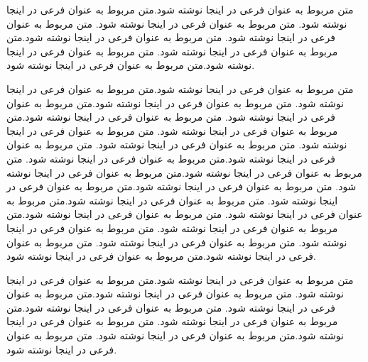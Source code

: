     متن مربوط به عنوان فرعی در اینجا نوشته شود.متن مربوط به عنوان فرعی در اینجا نوشته شود. متن مربوط به عنوان فرعی در اینجا نوشته شود. متن مربوط به عنوان فرعی در اینجا نوشته شود. متن مربوط به عنوان فرعی در اینجا نوشته شود.متن مربوط به عنوان فرعی در اینجا نوشته شود. متن مربوط به عنوان فرعی در اینجا نوشته شود.متن مربوط به عنوان فرعی در اینجا نوشته شود. 
   
   متن مربوط به عنوان فرعی در اینجا نوشته شود.متن مربوط به عنوان فرعی در اینجا نوشته شود. متن مربوط به عنوان فرعی در اینجا نوشته شود.متن مربوط به عنوان فرعی در اینجا نوشته شود. متن مربوط به عنوان فرعی در اینجا نوشته شود.متن مربوط به عنوان فرعی در اینجا نوشته شود. متن مربوط به عنوان فرعی در اینجا نوشته شود. متن مربوط به عنوان فرعی در اینجا نوشته شود. متن مربوط به عنوان فرعی در اینجا نوشته شود.متن مربوط به عنوان فرعی در اینجا نوشته شود. متن مربوط به عنوان فرعی در اینجا نوشته شود.متن مربوط به عنوان فرعی در اینجا نوشته شود. متن مربوط به عنوان فرعی در اینجا نوشته شود.متن مربوط به عنوان فرعی در اینجا نوشته شود. متن مربوط به عنوان فرعی در اینجا نوشته شود.متن مربوط به عنوان فرعی در اینجا نوشته شود. متن مربوط به عنوان فرعی در اینجا نوشته شود.متن مربوط به عنوان فرعی در اینجا نوشته شود. متن مربوط به عنوان فرعی در اینجا نوشته شود. متن مربوط به عنوان فرعی در اینجا نوشته شود. متن مربوط به عنوان فرعی در اینجا نوشته شود.متن مربوط به عنوان فرعی در اینجا نوشته شود. 
   
   متن مربوط به عنوان فرعی در اینجا نوشته شود.متن مربوط به عنوان فرعی در اینجا نوشته شود. متن مربوط به عنوان فرعی در اینجا نوشته شود.متن مربوط به عنوان فرعی در اینجا نوشته شود. متن مربوط به عنوان فرعی در اینجا نوشته شود.متن مربوط به عنوان فرعی در اینجا نوشته شود. متن مربوط به عنوان فرعی در اینجا نوشته شود.متن مربوط به عنوان فرعی در اینجا نوشته شود. متن مربوط به عنوان فرعی در اینجا نوشته شود.